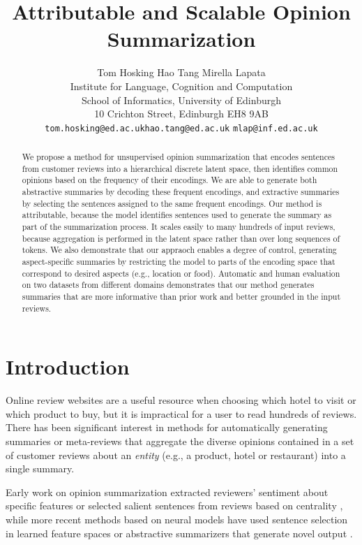 \documentclass[11pt]{article}
\title{Attributable and Scalable Opinion Summarization}
\author{{Tom Hosking \qquad Hao Tang \qquad Mirella Lapata} \\
  Institute for Language, Cognition and Computation \\
  School of Informatics, University of Edinburgh \\
  10 Crichton Street, Edinburgh EH8 9AB\\
  \texttt{tom.hosking@ed.ac.uk}\quad \texttt{hao.tang@ed.ac.uk} \quad \texttt{mlap@inf.ed.ac.uk}}
\begin{document}
\maketitle
\begin{abstract}
We propose a method for unsupervised opinion summarization that encodes sentences from customer reviews into a hierarchical discrete latent space, then identifies common opinions based on the frequency of their encodings. We are able to generate both abstractive summaries by decoding these frequent encodings, and extractive summaries by selecting the sentences assigned to the same frequent encodings. Our method is attributable, because the model identifies sentences used to generate the summary as part of the summarization process. It scales easily to many hundreds of input reviews, because aggregation is performed in the latent space rather than over long sequences of tokens. We also demonstrate that our appraoch enables a degree of control, generating aspect-specific summaries by restricting the model to parts of the encoding space that correspond to desired aspects (e.g., location or food). Automatic and human evaluation on two datasets from different domains demonstrates that our method generates summaries that are more informative than prior work and better grounded in the input reviews.
\end{abstract}

\section{Introduction}

Online review websites are a useful resource when choosing which hotel to visit or which product to buy, but it is impractical for a user to read hundreds of reviews. There has been significant interest in methods for automatically generating summaries or {meta-reviews} that aggregate the diverse opinions contained in a set of customer reviews about an \textit{entity} (e.g., a product, hotel or restaurant) into a single summary. 

Early work on opinion summarization extracted reviewers' sentiment about specific features \cite{10.1145/1014052.1014073} or selected salient sentences from reviews based on centrality \cite{lexrank}, while more recent methods based on neural models have used sentence selection in learned feature spaces \cite{angelidis-etal-2021-extractive,basu-roy-chowdhury-etal-2022-unsupervised} or abstractive summarizers that generate novel output \cite{brazinskas-etal-2020-unsupervised,brazinskas-etal-2021-learning,amplayo-etal-2021-aspect, amplayo2021unsupervised,iso-etal-2021-convex-aggregation,coavoux-etal-2019-unsupervised}.
\end{document}
